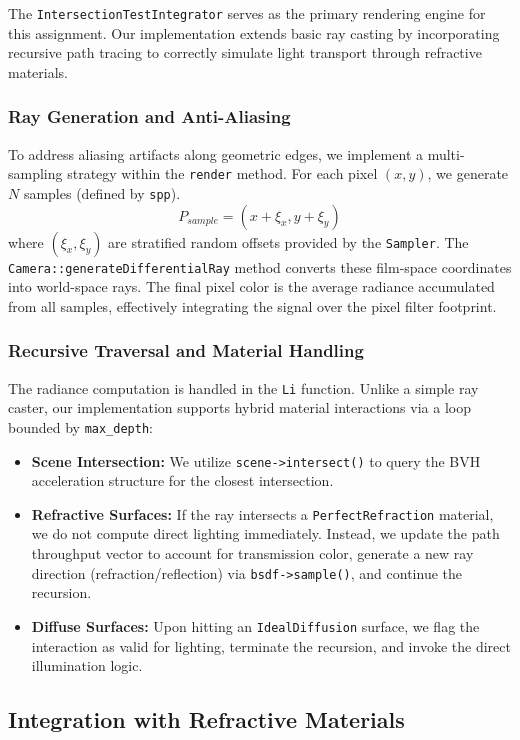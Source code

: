 \documentclass[acmtog]{acmart}
\begin{document}
The \texttt{IntersectionTestIntegrator} serves as the primary rendering engine for this assignment. Our implementation extends basic ray casting by incorporating recursive path tracing to correctly simulate light transport through refractive materials.

\subsubsection{Ray Generation and Anti-Aliasing}
To address aliasing artifacts along geometric edges, we implement a multi-sampling strategy within the \texttt{render} method. For each pixel $(x, y)$, we generate $N$ samples (defined by \texttt{spp}).
\begin{equation}
    P_{sample} = (x + \xi_x, y + \xi_y)
\end{equation}
where $(\xi_x, \xi_y)$ are stratified random offsets provided by the \texttt{Sampler}. The \texttt{Camera::generateDifferentialRay} method converts these film-space coordinates into world-space rays. The final pixel color is the average radiance accumulated from all samples, effectively integrating the signal over the pixel filter footprint.

\subsubsection{Recursive Traversal and Material Handling}
The radiance computation is handled in the \texttt{Li} function. Unlike a simple ray caster, our implementation supports hybrid material interactions via a loop bounded by \texttt{max\_depth}:
\begin{itemize}
    \item \textbf{Scene Intersection:} We utilize \texttt{scene->intersect()} to query the BVH acceleration structure for the closest intersection.
    \item \textbf{Refractive Surfaces:} If the ray intersects a \texttt{PerfectRefraction} material, we do not compute direct lighting immediately. Instead, we update the path throughput vector to account for transmission color, generate a new ray direction (refraction/reflection) via \texttt{bsdf->sample()}, and continue the recursion.
    \item \textbf{Diffuse Surfaces:} Upon hitting an \texttt{IdealDiffusion} surface, we flag the interaction as valid for lighting, terminate the recursion, and invoke the direct illumination logic.
\end{itemize}
\subsection{Integration with Refractive Materials}
\end{document}
